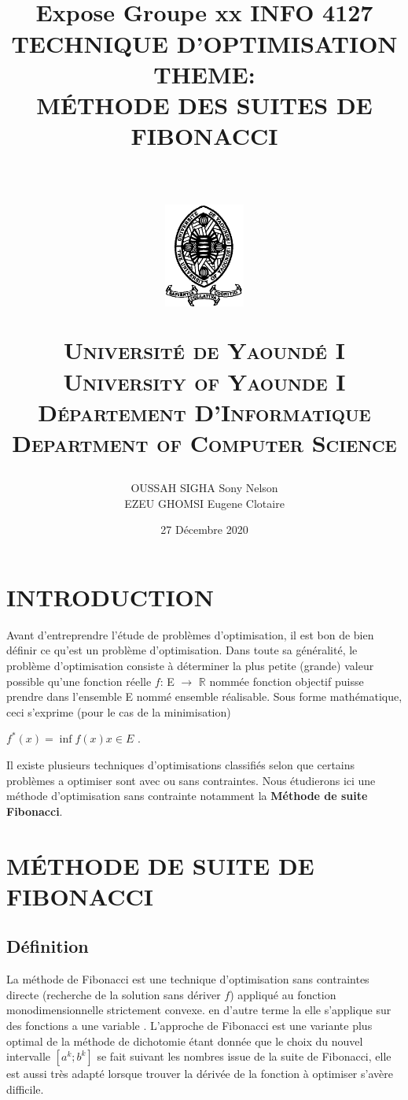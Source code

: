 \documentclass[a4paper,13pt]{article}
\title{
    \horrule{0.5pt} \\ [0.4cm]
    \Huge Expose Groupe xx INFO 4127 TECHNIQUE D'OPTIMISATION\\ THEME: \\ MÉTHODE DES SUITES DE FIBONACCI\\
    \horrule{2pt} \\[0.5cm]
\begin{center}
\includegraphics[width=100px]{univyde1}\\[15pt]
\end{center}
    \usefont{OT1}{bch}{b}{n}
    \normalfont \normalsize \textsc{Université de Yaoundé I\\University of Yaounde I} \\ [25pt]
    \normalfont \normalsize \textsc{Département D'Informatique\\Department of Computer Science} \\ [20pt]
 }
\author{
    \normalfont                                 
    OUSSAH SIGHA Sony Nelson \\[5pt]
    EZEU GHOMSI Eugene Clotaire  \\[5pt]    
    \normalsize
}
\date{27 Décembre 2020}
\begin{document}
\maketitle

\pagebreak

\tableofcontents


\pagebreak




\section*{INTRODUCTION}

Avant d’entreprendre l’étude de problèmes d’optimisation, il est bon de bien définir ce
qu’est un problème d’optimisation. Dans toute sa généralité, le problème d’optimisation
consiste à déterminer la plus petite (grande) valeur possible qu’une fonction réelle $f$: E $\longrightarrow$ $\mathbb{R}$ nommée fonction objectif puisse prendre dans l’ensemble E nommé ensemble réalisable. Sous forme mathématique, ceci s’exprime (pour le cas de la minimisation)

\begin{center}
$ f^{*}(x) = \inf f(x) x \in E $ .
\end{center}

Il existe plusieurs techniques d'optimisations classifiés selon que certains problèmes a optimiser sont avec ou sans contraintes. Nous étudierons ici une méthode d'optimisation sans contrainte notamment la \textbf{Méthode de suite Fibonacci}.\\

\section{MÉTHODE DE SUITE DE FIBONACCI}

\subsection{Définition}

La méthode de Fibonacci est une technique d'optimisation sans contraintes directe (recherche de la solution sans dériver $f$) appliqué au fonction monodimensionnelle strictement convexe. en d'autre terme la elle s'applique sur des fonctions a une variable  . L'approche de Fibonacci est une variante plus optimal de la méthode de dichotomie étant donnée que le choix du nouvel intervalle $[a^{k}; b^{k}]$ se fait suivant les nombres issue de la suite de Fibonacci, elle est aussi très adapté lorsque trouver la dérivée de la fonction à optimiser s'avère difficile.
\end{document}
